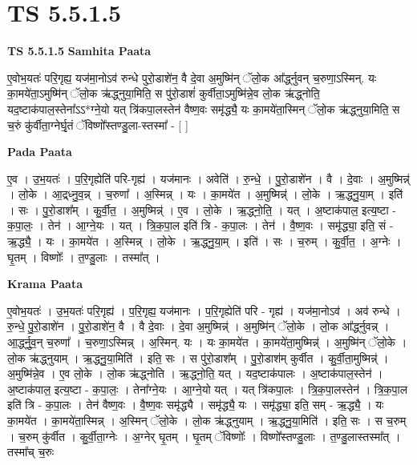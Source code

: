 \documentclass[17pt]{extarticle}
\begin{document}
\section{ TS 5.5.1.5 }

\textbf{TS 5.5.1.5 } \newline
\textbf{Samhita Paata} \newline

ए॒वोभ॒यतः॑ परि॒गृह्य॒ यज॑मा॒नोऽव॑ रुन्धे पुरो॒डाशे॑न॒ वै दे॒वा अ॒मुष्मि॑न् ॅलो॒क आ᳚र्द्ध्नुवन् च॒रुणा॒ऽस्मिन्. यः का॒मये॑ता॒ऽमुष्मि॑न् ॅलो॒क ऋ॑द्ध्नुया॒मिति॒ स पु॑रो॒डाशं॑ कुर्वीता॒ऽमुष्मि॑न्ने॒व लो॒क ऋ॑द्ध्नोति॒ यद॒ष्टाक॑पाल॒स्तेना᳚ऽऽ*ग्ने॒यो यत् त्रि॑कपा॒लस्तेन॑ वैष्ण॒वः समृ॑द्ध्यै॒ यः का॒मये॑ता॒स्मिन् ॅलो॒क ऋ॑द्ध्नुया॒मिति॒ स च॒रुं कु॑र्वीता॒ग्नेर्घृ॒तं ॅविष्णो᳚स्तण्डु॒ला-स्तस्मा᳚ - [  ] \newline

\textbf{Pada Paata} \newline

ए॒व । उ॒भ॒यतः॑ । प॒रि॒गृह्येति॑ परि-गृह्य॑ । यज॑मानः । अवेति॑ । रु॒न्धे॒ । पु॒रो॒डाशे॑न । वै । दे॒वाः । अ॒मुष्मिन्न्॑ । लो॒के । आ॒द्र्ध्नु॒व॒न्न् । च॒रुणा᳚ । अ॒स्मिन्न् । यः । का॒मये॑त । अ॒मुष्मिन्न्॑ । लो॒के । ऋ॒द्ध्नु॒या॒म् । इति॑ । सः । पु॒रो॒डाश᳚म् । कु॒र्वी॒त॒ । अ॒मुष्मिन्न्॑ । ए॒व । लो॒के । ऋ॒द्ध्नो॒ति॒ । यत् । अ॒ष्टाक॑पाल॒ इत्य॒ष्टा - क॒पा॒लः॒ । तेन॑ । आ॒ग्ने॒यः । यत् । त्रि॒क॒पा॒ल इति॑ त्रि - क॒पा॒लः । तेन॑ । वै॒ष्ण॒वः । समृ॑द्ध्या॒ इति॒ सं - ऋ॒द्ध्यै॒ । यः । का॒मये॑त । अ॒स्मिन्न् । लो॒के । ऋ॒द्ध्नु॒या॒म् । इति॑ । सः । च॒रुम् । कु॒र्वी॒त॒ । अ॒ग्नेः । घृ॒तम् । विष्णोः᳚ । त॒ण्डु॒लाः । तस्मा᳚त् ।  \newline


\textbf{Krama Paata} \newline

ए॒वोभ॒यतः॑ । उ॒भ॒यतः॑ परि॒गृह्य॑ । प॒रि॒गृह्य॒ यज॑मानः । प॒रि॒गृह्येति॑ परि - गृह्य॑ । यज॑मा॒नोऽव॑ । अव॑ रुन्धे । रु॒न्धे॒ पु॒रो॒डाशे॑न । पु॒रो॒डाशे॑न॒ वै । वै दे॒वाः । दे॒वा अ॒मुष्मिन्न्॑ । अ॒मुष्मि॑न् ॅलो॒के । लो॒क आ᳚र्द्ध्नुवन्न् । आ॒र्द्ध्नु॒व॒न् च॒रुणा᳚ । च॒रुणा॒ऽस्मिन्न् । अ॒स्मिन्. यः । यः का॒मये॑त । का॒मये॑ता॒मुष्मिन्न्॑ । अ॒मुष्मि॑न् ॅलो॒के । लो॒क ऋ॑द्ध्नुयाम् । ऋ॒द्ध्नु॒या॒मिति॑ । इति॒ सः । स पु॑रो॒डाश᳚म् । पु॒रो॒डाश॑म् कुर्वीत । कु॒र्वी॒ता॒मुष्मिन्न्॑ । अ॒मुष्मि॑न्ने॒व । ए॒व लो॒के । लो॒क ऋ॑द्ध्नोति । ऋ॒द्ध्नो॒ति॒ यत् । यद॒ष्टाक॑पालः । अ॒ष्टाक॑पाल॒स्तेन॑ । अ॒ष्टाक॑पाल॒ इत्य॒ष्टा - क॒पा॒लः॒ । तेना᳚ग्ने॒यः । आ॒ग्ने॒यो यत् । यत् त्रि॑कपा॒लः । त्रि॒क॒पा॒लस्तेन॑ । त्रि॒क॒पा॒ल इति॑ त्रि - क॒पा॒लः । तेन॑ वैष्ण॒वः । वै॒ष्ण॒वः समृ॑द्ध्यै । समृ॑द्ध्यै॒ यः । समृ॑द्ध्या॒ इति॒ सम् - ऋ॒द्ध्यै॒ । यः का॒मये॑त । का॒मये॑ता॒स्मिन्न् । अ॒स्मिन् ॅलो॒के । लो॒क ऋ॑द्ध्नुयाम् । ऋ॒द्ध्नु॒या॒मिति॑ । इति॒ सः । स च॒रुम् । च॒रुम् कु॑र्वीत । कु॒र्वी॒ता॒ग्नेः । अ॒ग्नेर् घृ॒तम् । घृ॒तम् ॅविष्णोः᳚ । विष्णो᳚स्तण्डु॒लाः । त॒ण्डु॒लास्तस्मा᳚त् । तस्मा᳚च् च॒रुः \newline
\end{document}
